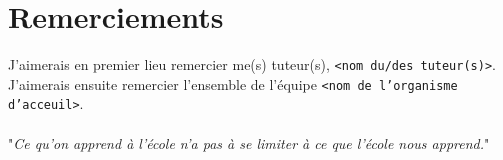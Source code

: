 \chapter*{Remerciements}

\noindent

J'aimerais en premier lieu remercier me(s) tuteur(s), \texttt{<nom du/des tuteur(s)>}. \\

J'aimerais ensuite remercier l'ensemble de l'équipe \texttt{<nom de l'organisme d'acceuil>}. \\

\lipsum[1] \\

"{\it Ce qu'on apprend à l'école n'a pas à se limiter à ce que l'école nous apprend.}" 
